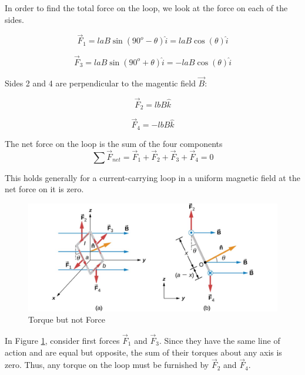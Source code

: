 \documentclass[14pt]{memoir}
\begin{document}
In order to find the total force on the loop, we look at the force on each of the sides.

\begin{equation}
\vec{F}_1 = l a B \sin(90^o - \theta) \hat{i} = l a B \cos(\theta) \hat{i}
\end{equation}

\begin{equation}
\vec{F}_3 = l a B \sin(90^o + \theta) \hat{i} = -l a B \cos(\theta) \hat{i}
\end{equation}

Sides 2 and 4 are perpendicular to the magentic field $\vec{B}$:

\begin{equation}
\vec{F}_2 = l b B \hat{k}
\end{equation}

\begin{equation}
\vec{F}_4 = -l b B \hat{k}
\end{equation}


The net force on the loop is the sum of the four components
\begin{equation}
\sum \vec{F}_{net} = \vec{F}_1 + \vec{F}_2 + \vec{F}_3 + \vec{F}_4 = 0
\end{equation}

This holds generally for a current-carrying loop in a uniform magnetic field at the net force on it is zero.

\begin{figure}[H]
\begin{center}
\includegraphics[scale=0.50]{fig/fig_11_16.jpg}
\caption{Torque but not Force}
\label{fig:11_16}
\end{center}
\end{figure}

In Figure \ref{fig:11_16}, consider first forces $\vec{F}_1$ and $\vec{F}_3$. Since they have the same line of action and are equal but opposite, the sum of their torques about any axis is zero. Thus, any torque on the loop must be furnished by  $\vec{F}_2$ and $\vec{F}_4$.
\end{document}
